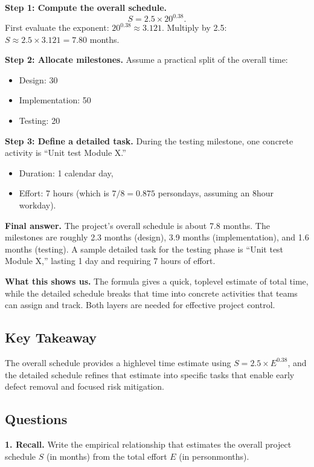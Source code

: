 \documentclass[12pt, a4paper]{article}
\begin{document}
\medskip
\textbf{Step 1: Compute the overall schedule.}  
\[
S = 2.5 \times 20^{0.38}.
\]  
First evaluate the exponent: \(20^{0.38} \approx 3.121\).  
Multiply by 2.5: \(S \approx 2.5 \times 3.121 = 7.80\) months.  

\textbf{Step 2: Allocate milestones.}  
Assume a practical split of the overall time:  
\begin{itemize}
  \item Design: 30 %
  \item Implementation: 50 %
  \item Testing: 20 %
\end{itemize}

\textbf{Step 3: Define a detailed task.}  
During the testing milestone, one concrete activity is ``Unit test Module X.''  
\begin{itemize}
  \item Duration: 1 calendar day,
  \item Effort: 7 hours (which is \(7/8 = 0.875\) persondays, assuming an 8hour workday).
\end{itemize}

\textbf{Final answer.}  
The project's overall schedule is about 7.8 months.  The milestones are roughly 2.3 months (design), 3.9 months (implementation), and 1.6 months (testing).  A sample detailed task for the testing phase is ``Unit test Module X,'' lasting 1 day and requiring 7 hours of effort.

\textbf{What this shows us.}  
The formula gives a quick, toplevel estimate of total time, while the detailed schedule breaks that time into concrete activities that teams can assign and track.  Both layers are needed for effective project control.

\subsection{Key Takeaway}
The overall schedule provides a highlevel time estimate using \(S = 2.5 \times E^{0.38}\), and the detailed schedule refines that estimate into specific tasks that enable early defect removal and focused risk mitigation.

\subsection*{Questions}
\newpage
\textbf{1. Recall.}  
Write the empirical relationship that estimates the overall project schedule \(S\) (in months) from the total effort \(E\) (in personmonths).
\end{document}
